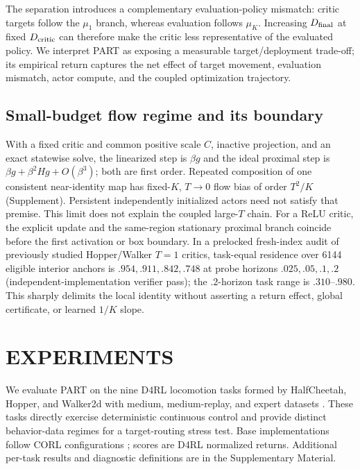 \documentclass[twoside]{article}
\begin{document}
The separation introduces a complementary evaluation-policy mismatch: critic
targets follow the $\mu_1$ branch, whereas evaluation follows $\mu_K$.
Increasing $D_{\rm final}$ at fixed $D_{\rm critic}$ can therefore make the
critic less representative of the evaluated policy. We interpret PART as
exposing a measurable target/deployment trade-off; its empirical return
captures the net effect of target movement, evaluation mismatch, actor compute,
and the coupled optimization trajectory.

\subsection{Small-budget flow regime and its boundary}

With a fixed critic and common positive scale $C$, inactive projection, and an
exact statewise solve, the linearized step is $\beta g$ and the ideal proximal
step is $\beta g+\beta^2Hg+O(\beta^3)$; both are first order. Repeated
composition of one consistent near-identity map has fixed-$K$, $T\to0$ flow
bias of order $T^2/K$ (Supplement). Persistent independently initialized
actors need not satisfy that premise. This limit does not explain the coupled
large-$T$ chain. For a ReLU critic, the explicit update and the same-region
stationary proximal branch coincide before the first activation or box
boundary. In a prelocked
fresh-index audit of previously studied Hopper/Walker $T=1$ critics, task-equal
residence over 6144 eligible interior anchors is $.954,.911,.842,.748$ at probe
horizons $.025,.05,.1,.2$ (independent-implementation verifier pass); the
$.2$-horizon task range is $.310$--$.980$. This sharply delimits the local
identity
without asserting a return effect, global certificate, or learned $1/K$ slope.

\section{EXPERIMENTS}
\label{sec:experiments}

We evaluate PART on the nine D4RL locomotion tasks formed by HalfCheetah,
Hopper, and Walker2d with medium, medium-replay, and expert datasets
\citep{fu2020d4rl}. These tasks directly exercise deterministic continuous
control and provide distinct behavior-data regimes for a target-routing stress
test. Base implementations follow CORL configurations
\citep{tarasov2022corl}; scores are D4RL normalized returns. Additional
per-task results and diagnostic definitions are in
the Supplementary Material.
\end{document}
